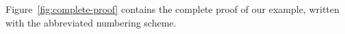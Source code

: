 Figure~\ref{fig:complete-proof} contains the complete proof of
our example, written with the abbreviated numbering scheme.







